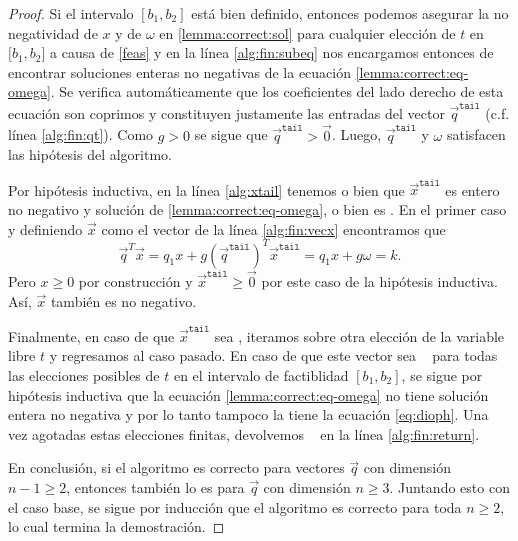\begin{proof}
	Si el intervalo $[b_1, b_2]$ está bien definido, entonces podemos asegurar la no negatividad de
	$x$ y de $\omega$ en \eqref{lemma:correct:sol} para cualquier elección de $t$ en $[b_1, b_2$] a
	causa de \eqref{feas} y en la línea \ref{alg:fin:subeq} nos encargamos entonces de encontrar
	soluciones enteras no negativas de la ecuación \eqref{lemma:correct:eq-omega}. Se verifica
	automáticamente que los coeficientes del lado derecho de esta ecuación son coprimos y
	constituyen justamente las entradas del vector $\vec{q}^{\texttt{tail}}$ (c.f. línea
	\ref{alg:fin:qt}). Como $g > 0$ se sigue que $\vec{q}^{\texttt{tail}} > \vec{0}$. Luego,
	$\vec{q}^{\texttt{tail}}$ y $\omega$ satisfacen las hipótesis del algoritmo.

	Por hipótesis inductiva, en la línea \ref{alg:xtail} tenemos o bien que
	$\vec{x}^{\texttt{tail}}$ es entero no negativo y solución de \eqref{lemma:correct:eq-omega}, o
	bien es \NIL. En el primer caso y definiendo $\vec{x}$ como el vector de la línea
	\ref{alg:fin:vecx} encontramos que
	\begin{equation*}
		\vec{q}^T\vec{x} = q_1x + g\left(\vec{q}^{\texttt{tail}}\right)^T\vec{x}^{\texttt{tail}}
		= q_1x + g\omega = k.
	\end{equation*}
	Pero $x \geq 0$ por construcción y $\vec{x}^{\texttt{tail}} \geq \vec{0}$ por este caso de la
	hipótesis inductiva. Así, $\vec{x}$ también es no negativo.

	Finalmente, en caso de que $\vec{x}^{\texttt{tail}}$ sea \NIL, iteramos sobre otra elección de
	la variable libre $t$ y regresamos al caso pasado. En caso de que este vector sea \NIL~ para
	todas las elecciones posibles de $t$ en el intervalo de factiblidad $[b_1, b_2]$, se sigue por
	hipótesis inductiva que la ecuación \eqref{lemma:correct:eq-omega} no tiene solución entera no
	negativa y por lo tanto tampoco la tiene la ecuación \eqref{eq:dioph}. Una vez agotadas estas
	elecciones finitas, devolvemos \NIL~ en la línea \ref{alg:fin:return}.

	En conclusión, si el algoritmo es correcto para vectores $\vec{q}$ con dimensión $n - 1 \geq 2$,
	entonces también lo es para $\vec{q}$ con dimensión $n \geq 3$. Juntando esto con el
	caso base, se sigue por inducción que el algoritmo es correcto para toda $n \geq 2$, lo cual
	termina la demostración.
\end{proof}

